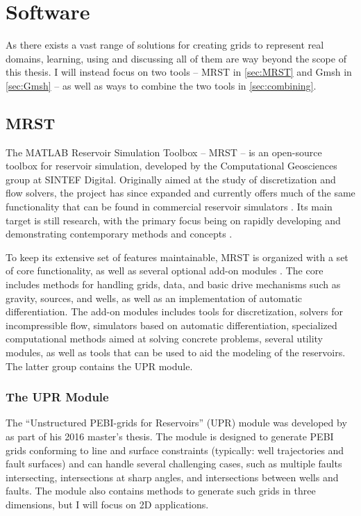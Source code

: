 \section{Software}
\label{sec:Software}
As there exists a vast range of solutions for creating grids to represent real domains, learning, using and discussing all of them are way beyond the scope of this thesis. I will instead focus on two tools -- MRST in \autoref{sec:MRST} and Gmsh in \autoref{sec:Gmsh} -- as well as ways to combine the two tools in \autoref{sec:combining}. 

\subsection{MRST}
\label{sec:MRST}
The MATLAB Reservoir Simulation Toolbox -- MRST -- is an open-source toolbox for reservoir simulation, developed by the Computational Geosciences group at SINTEF Digital. Originally aimed at the study of discretization and flow solvers, the project has since expanded and currently offers much of the same functionality that can be found in commercial reservoir simulators \cite{MRST_book}. Its main target is still research, with the primary focus being on rapidly developing and demonstrating contemporary methods and concepts \cite{MRST_website}.

To keep its extensive set of features maintainable, MRST is organized with a set of core functionality, as well as several optional add-on modules \cite{MRST_book}. The core includes methods for handling grids, data, and basic drive mechanisms such as gravity, sources, and wells, as well as an implementation of automatic differentiation. The add-on modules includes tools for discretization, solvers for incompressible flow, simulators based on automatic differentiation, specialized computational methods aimed at solving concrete problems, several utility modules, as well as tools that can be used to aid the modeling of the reservoirs. The latter group contains the UPR module.


\subsubsection{The UPR Module}
\label{sec:UPR}
The ``Unstructured PEBI-grids for Reservoirs'' (UPR) module was developed by \textcite{UPR_thesis} as part of his 2016 master's thesis. The module is designed to generate PEBI grids conforming to line and surface constraints (typically: well trajectories and fault surfaces) and can handle several challenging cases, such as multiple faults intersecting, intersections at sharp angles, and intersections between wells and faults. The module also contains methods to generate such grids in three dimensions, but I will focus on 2D applications.


